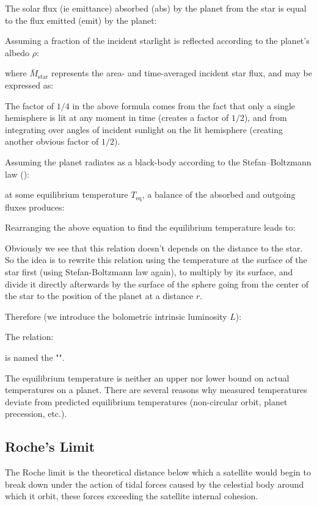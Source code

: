 	The solar flux (ie emittance) absorbed (abs) by the planet from the star is equal to the flux emitted (emit) by the planet:
	
	Assuming a fraction of the incident starlight is reflected according to the planet's albedo $\rho$:
	
	where $\bar{M}_{\text{star}}$ represents the area- and time-averaged incident star flux, and may be expressed as:
	
	The factor of $1/4$ in the above formula comes from the fact that only a single hemisphere is lit at any moment in time (creates a factor of $1/2$), and from integrating over angles of incident sunlight on the lit hemisphere (creating another obvious factor of $1/2$).
	
	Assuming the planet radiates as a black-body according to the Stefan–Boltzmann law ():
	
	at some equilibrium temperature ${T}_{\text{eq}}$, a balance of the absorbed and outgoing fluxes produces:
	
	Rearranging the above equation to find the equilibrium temperature leads to:
	
	Obviously we see that this relation doesn't depends on the distance to the star. So the idea is to rewrite this relation using the temperature at the surface of the star first (using Stefan-Boltzmann law again), to multiply by its surface, and divide it directly afterwards by the surface of the sphere going from the center of the star to the position of the planet at a distance $r$. 
	
	Therefore (we introduce the bolometric intrinsic luminosity $L$):
	
	The relation:
	
	is named the "". 
	
	The equilibrium temperature is neither an upper nor lower bound on actual temperatures on a planet. There are several reasons why measured temperatures deviate from predicted equilibrium temperatures (non-circular orbit, planet precession, etc.).

	\pagebreak	
	\subsection{Roche's Limit}\label{roche limit}
	The Roche limit is the theoretical distance below which a satellite would begin to break down under the action of tidal forces caused by the celestial body around which it orbit, these forces exceeding the satellite internal cohesion.
	
